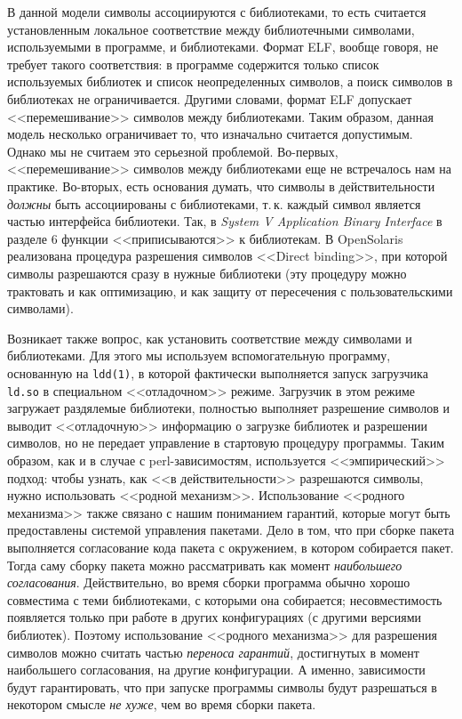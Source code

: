\documentclass[russian,a4paper,12pt,titlepage]{article}
\begin{document}
В данной модели символы ассоциируются с библиотеками, то есть считается установленным локальное соответствие между
библиотечными символами, используемыми в программе, и библиотеками.  Формат ELF, вообще говоря, не требует такого соответствия:
в программе содержится только список используемых библиотек и список неопределенных символов, а поиск символов в библиотеках
не ограничивается.  Другими словами, формат ELF допускает <<перемешивание>> символов между библиотеками.  Таким образом,
данная модель несколько ограничивает то, что изначально считается допустимым.  Однако мы не считаем это серьезной проблемой.
Во-первых, <<перемешивание>> символов между библиотеками еще не встречалось нам на практике.  Во-вторых, есть основания думать,
что символы в действительности \emph{должны} быть ассоциированы с библиотеками, т.\,к. каждый символ является частью интерфейса
библиотеки.  Так, в \emph{System V Application Binary Interface} в разделе 6 функции <<приписываются>> к библиотекам.
В OpenSolaris реализована процедура разрешения символов <<Direct binding>>, при которой символы разрешаются сразу
в нужные библиотеки (эту процедуру можно трактовать и как оптимизацию, и как защиту от пересечения с пользовательскими символами).

Возникает также вопрос, как установить соответствие между символами и библиотеками.  Для этого мы используем вспомогательную
программу, основанную на \verb|ldd(1)|, в которой фактически выполняется запуск загрузчика \verb|ld.so| в специальном <<отладочном>>
режиме.  Загрузчик в этом режиме загружает раздялемые библиотеки, полностью выполняет разрешение символов и выводит <<отладочную>>
информацию о загрузке библиотек и разрешении символов, но не передает управление в стартовую процедуру программы.  Таким образом,
как и в случае с perl-зависимостям, используется <<эмпирический>> подход: чтобы узнать, как <<в действительности>> разрешаются символы,
нужно использовать <<родной механизм>>.  Использование <<родного механизма>> также связано с нашим пониманием гарантий, которые
могут быть предоставлены системой управления пакетами.  Дело в том, что при сборке пакета выполняется согласование кода пакета
с окружением, в котором собирается пакет.  Тогда саму сборку пакета можно рассматривать как момент \emph{наибольшего согласования}.
Действительно, во время сборки программа обычно хорошо совместима с теми библиотеками, с которыми она собирается; несовместимость
появляется только при работе в других конфигурациях (с другими версиями библиотек).  Поэтому использование <<родного механизма>>
для разрешения символов можно считать частью \emph{переноса гарантий}, достигнутых в момент наибольшего согласования, на другие
конфигурации.  А именно, зависимости будут гарантировать, что при запуске программы символы будут разрешаться в некотором смысле
\emph{не хуже}, чем во время сборки пакета.
\end{document}
